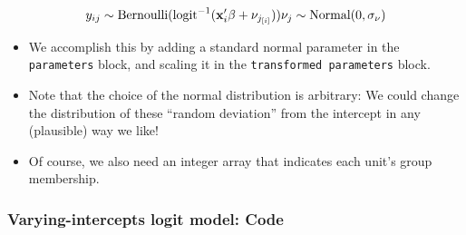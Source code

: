 \documentclass[
  11pt,
]{article}
\providecommand{\tightlist}{%
  \setlength{\itemsep}{0pt}\setlength{\parskip}{0pt}}
\begin{document}
\[y_{ij} \sim \text{Bernoulli}(\text{logit}^{-1}(\mathbf{x}_i^{\prime} \beta + \nu_{j_{[i]}})) \\
\nu_j \sim \text{Normal}(0, \sigma_{\nu})\]

\begin{itemize}
\tightlist
\item
  We accomplish this by adding a standard normal parameter in the \texttt{parameters} block, and scaling it in the \texttt{transformed\ parameters} block.
\item
  Note that the choice of the normal distribution is arbitrary: We could change the distribution of these ``random deviation'' from the intercept in any (plausible) way we like!
\item
  Of course, we also need an integer array that indicates each unit's group membership.
\end{itemize}

\hypertarget{varying-intercepts-logit-model-code}{%
\subsubsection{Varying-intercepts logit model: Code}\label{varying-intercepts-logit-model-code}}
\end{document}
